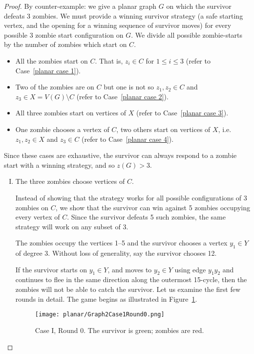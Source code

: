\begin{proof}
  By counter-example: we give a planar graph $G$ on which the survivor defeats 3 zombies.
  We must provide a winning survivor strategy (a safe starting vertex, and the opening for a winning sequence of survivor moves) for every possible 3 zombie start configuration on $G$. We divide all possible zombie-starts by the number of zombies which start on $C$.

  \begin{itemize}
  \item All the zombies start on $C$. That is, $z_i \in C$ for $1 \leq i \leq 3$ (refer to Case~\ref{planar case 1}).
  \item Two of the zombies are on $C$ but one is not so $z_1, z_2 \in C$ and $z_3 \in X = V(G) \setminus C$ (refer to Case~\ref{planar case 2}).
  \item All three zombies start on vertices of $X$ (refer to Case~\ref{planar case 3}).
  \item One zombie chooses a vertex of $C$, two others start on vertices of $X$, i.e. $z_1, z_2 \in X$ and $z_3 \in C$ (refer to Case~\ref{planar case 4}).
  \end{itemize}

  Since these cases are exhaustive, the survivor can always respond to a zombie start with a winning
  strategy, and so $z(G) > 3$.

  \begin{enumerate}[I.]
\item The three zombies choose vertices of $C$. \label{planar case 1}

Instead of showing that the strategy works for all possible configurations of 3 zombies on $C$,
we show that the survivor can win against 5 zombies occupying every vertex of $C$.
Since the survivor defeats 5 such zombies, the same strategy will work on any subset of 3.

The zombies occupy the vertices 1--5 and the survivor chooses a vertex $y_1 \in Y$ of degree 3.
Without loss of generality, say the survivor chooses 12.

If the survivor starts on $y_1 \in Y$, and moves to $y_2\in Y$ using edge $y_1y_2$ and continues to flee in the same direction along the outermost 15-cycle, then the zombies will not be able to catch the survivor. Let us examine the first few rounds in detail. The game begins as illustrated in Figure~\ref{fig:planarG2C1R0}.

\begin{figure}
\centering
\texttt{[image: planar/Graph2Case1Round0.png]}
\caption{Case I, Round 0. The survivor is green; zombies are red.\label{fig:planarG2C1R0}}
\end{figure}


\end{enumerate}
\end{proof}
